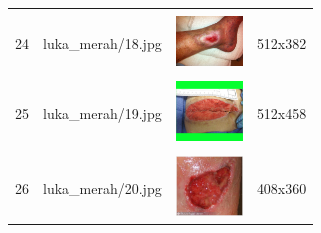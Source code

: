 \begin{table}[H]
\begin{tabular}{|m{0.2in}|m{1.2in}|m{0.7in}|m{0.7in}|}
		& &  &  \\
		24& 
		luka\_merah/18.jpg &
		\includegraphics[width=0.7in]{gambar/dataset_citra/luka_merah/18.jpg}&
		512x382\\
		\hline
		
		& &  &  \\
		25& 
		luka\_merah/19.jpg &
		\includegraphics[width=0.7in]{gambar/dataset_citra/luka_merah/19.jpg}&
		512x458\\
		\hline
		
		& &  &  \\
		26& 
		luka\_merah/20.jpg &
		\includegraphics[width=0.7in]{gambar/dataset_citra/luka_merah/20.jpg}&
		408x360\\
		\hline

	\end{tabular}
\end{table}

